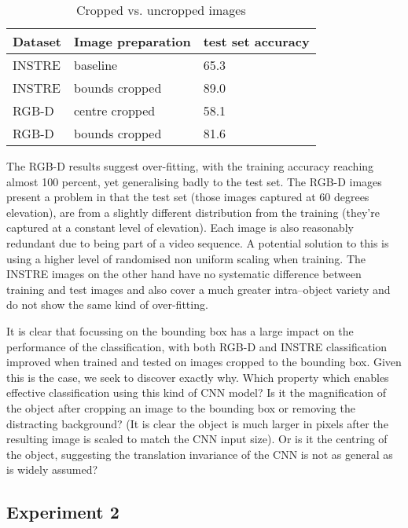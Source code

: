 \documentclass[conference]{IEEEtran}
\begin{document}
\begin{table}[h]
  \centering
    \caption{Cropped vs. uncropped images }
    
  \begin{tabular}{ l l l }
    
    Dataset & Image preparation & test set accuracy \\
    \toprule
    
    INSTRE & baseline &  65.3 \\
    INSTRE & bounds cropped & 89.0 \\
    
    RGB-D & centre cropped & 58.1 \\
    RGB-D & bounds cropped & 81.6 \\
    
    \bottomrule
  \end{tabular}
\label{fig:crop}
\end{table}

The RGB-D results suggest over-fitting, with the training accuracy reaching almost 100 percent, yet generalising badly to the test set. The RGB-D images present a problem in that the test set (those images captured at 60 degrees elevation), are from a slightly different distribution from the training (they're captured at a constant level of elevation). Each image is also reasonably redundant due to being part of a video sequence. A potential solution to this is using a higher level of randomised non uniform scaling when training. The INSTRE images on the other hand have no systematic difference between training and test images and also cover a much greater intra--object variety and do not show the same kind of over-fitting.

It is clear that focussing on the bounding box has a large impact on the performance of the classification, with both RGB-D and INSTRE classification improved when trained and tested on images cropped to the bounding box. Given this is the case, we seek to discover exactly why. Which property which enables effective classification using this kind of CNN model? Is it the magnification of the object after cropping an image to the bounding box or removing the distracting background? (It is clear the object is much larger in pixels after the resulting image is scaled to match the CNN input size). Or is it the centring of the object, suggesting the translation invariance of the CNN is not as general as is widely assumed?


\subsection {Experiment 2}
\end{document}
